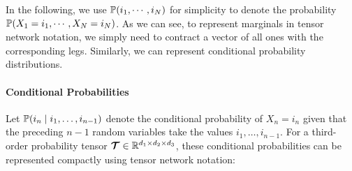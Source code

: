 In the following, we use $\mathbb{P}(i_1,\cdots,i_N)$ for simplicity to denote the probability $\mathbb{P}(X_1=i_1,\cdots,X_N=i_N)$. 
As we can see, to represent marginals in tensor network notation, we simply need to contract a vector of all ones with the corresponding legs.
Similarly, we can represent conditional probability distributions.
\paragraph{Conditional Probabilities}
Let 
$\mathbb{P}(i_n \mid i_1, \dots, i_{n-1})
$
denote the conditional probability of $X_n = i_n$ given that the preceding $n-1$ random variables take the values $i_1, \dots, i_{n-1}$.  
For a third-order probability tensor $\bm{\mathcal{T}}\in \mathbb{R}^{d_1 \times d_2 \times d_3}$, these conditional probabilities can be represented compactly using tensor network notation:
